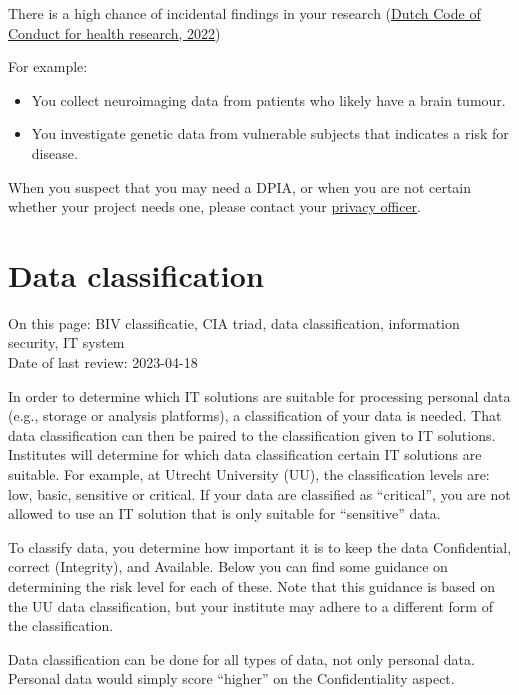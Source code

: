 \documentclass[
]{book}
\providecommand{\tightlist}{%
  \setlength{\itemsep}{0pt}\setlength{\parskip}{0pt}}
\begin{document}
There is a high chance of incidental findings in your research
(\href{https://www.coreon.org/wp-content/uploads/2022/01/Gedragscode-Gezondheidsonderzoek-2022.pdf\#page=58}{Dutch Code of Conduct for health research, 2022})

For example:

\begin{itemize}
\tightlist
\item
  You collect neuroimaging data from patients who likely have a brain tumour.
\item
  You investigate genetic data from vulnerable subjects that indicates a risk
  for disease.
\end{itemize}

When you suspect that you may need a DPIA, or when you are not certain whether
your project needs one, please contact your \protect\hyperlink{support}{privacy officer}.

\hypertarget{data-classification}{%
\section{Data classification}\label{data-classification}}

On this page: BIV classificatie, CIA triad, data classification, information
security, IT system\\
Date of last review: 2023-04-18

In order to determine which IT solutions are suitable for processing personal
data (e.g., storage or analysis platforms), a classification of your data is
needed. That data classification can then be paired to the classification given
to IT solutions. Institutes will determine for which data classification certain
IT solutions are suitable. For example, at Utrecht University (UU), the
classification levels are: low, basic, sensitive or critical. If your data are
classified as ``critical'', you are not allowed to use an IT solution that is only
suitable for ``sensitive'' data.

To classify data, you determine how important it is to keep the data
Confidential, correct (Integrity), and Available. Below you can find some
guidance on determining the risk level for each of these. Note that this
guidance is based on the UU data classification, but your institute may adhere
to a different form of the classification.

Data classification can be done for all types of data, not only personal data.
Personal data would simply score ``higher'' on the Confidentiality aspect.
\end{document}
